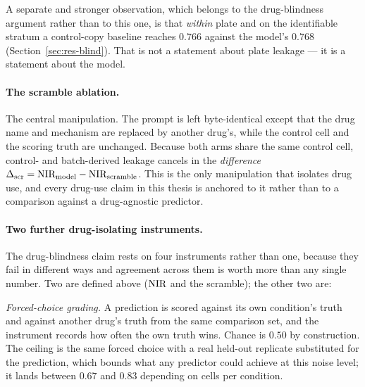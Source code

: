 A separate and stronger observation, which belongs to the drug-blindness argument rather than to this
one, is that \emph{within} plate and on the identifiable stratum a control-copy baseline reaches
$0.766$ against the model's $0.768$ (Section~\ref{sec:res-blind}). That is not a statement about
plate leakage --- it is a statement about the model.

\paragraph{The scramble ablation.} The central manipulation. The prompt is left byte-identical
except that the drug name and mechanism are replaced by another drug's, while the control cell and
the scoring truth are unchanged. Because both arms share the same control cell, control- and
batch-derived leakage cancels in the \emph{difference} $\Delta_{\textrm{scr}} = \textrm{NIR}_{\textrm{model}} -
\textrm{NIR}_{\textrm{scramble}}$. This is the only manipulation that isolates drug use, and every drug-use
claim in this thesis is anchored to it rather than to a comparison against a drug-agnostic
predictor.

\paragraph{Two further drug-isolating instruments.} The drug-blindness claim rests on four
instruments rather than one, because they fail in different ways and agreement across them is worth
more than any single number. Two are defined above ($\textrm{NIR}$ and the scramble); the other two are:

\emph{Forced-choice grading.} A prediction is scored against its own condition's truth and against
another drug's truth from the same comparison set, and the instrument records how often the own
truth wins. Chance is $0.50$ by construction. The ceiling is the same forced choice with a real
held-out replicate substituted for the prediction, which bounds what any predictor could achieve at
this noise level; it lands between $0.67$ and $0.83$ depending on cells per condition.

